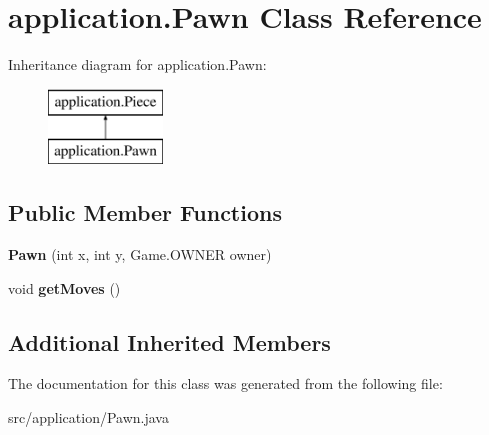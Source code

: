 \hypertarget{classapplication_1_1_pawn}{\section{application.\+Pawn Class Reference}
\label{classapplication_1_1_pawn}
}
Inheritance diagram for application.\+Pawn\+:\begin{figure}[H]
\begin{center}
\leavevmode
\includegraphics[height=2.000000cm]{classapplication_1_1_pawn}
\end{center}
\end{figure}
\subsection*{Public Member Functions}
\begin{DoxyCompactItemize}
\item 
\hypertarget{classapplication_1_1_pawn_aa4d6c3a524dabd13c17a220bfd5db423}{{\bfseries Pawn} (int x, int y, Game.\+O\+W\+N\+E\+R owner)}\label{classapplication_1_1_pawn_aa4d6c3a524dabd13c17a220bfd5db423}

\item 
\hypertarget{classapplication_1_1_pawn_a0a43e16b2e2d80001617aeb0cd0ad440}{void {\bfseries get\+Moves} ()}\label{classapplication_1_1_pawn_a0a43e16b2e2d80001617aeb0cd0ad440}

\end{DoxyCompactItemize}
\subsection*{Additional Inherited Members}


The documentation for this class was generated from the following file\+:\begin{DoxyCompactItemize}
\item 
src/application/Pawn.\+java\end{DoxyCompactItemize}
